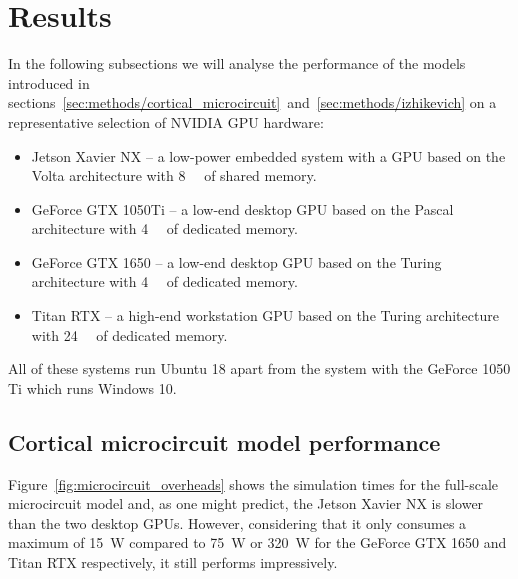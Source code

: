 \documentclass[utf8]{frontiersSCNS} %
\begin{document}
\section{Results}
In the following subsections we will analyse the performance of the models introduced in sections~\ref{sec:methods/cortical_microcircuit}~and~\ref{sec:methods/izhikevich} on a representative selection of NVIDIA GPU hardware:
%
\begin{itemize}
    \item Jetson Xavier NX -- a low-power embedded system with a GPU based on the Volta architecture with \SI{8}{\giga\byte} of shared memory.
    \item GeForce GTX 1050Ti -- a low-end desktop GPU based on the Pascal architecture with \SI{4}{\giga\byte} of dedicated memory.
    \item GeForce GTX 1650 -- a low-end desktop GPU based on the Turing architecture with \SI{4}{\giga\byte} of dedicated memory.
    \item Titan RTX -- a high-end workstation GPU based on the Turing architecture with \SI{24}{\giga\byte} of dedicated memory.
\end{itemize}
%
All of these systems run Ubuntu 18 apart from the system with the GeForce 1050 Ti which runs Windows 10.

\subsection{Cortical microcircuit model performance}
Figure~\ref{fig:microcircuit_overheads} shows the simulation times for the full-scale microcircuit model and, as one might predict, the Jetson Xavier NX is slower than the two desktop GPUs.
However, considering that it only consumes a maximum of \SI{15}{\watt} compared to \SI{75}{\watt} or \SI{320}{\watt} for the GeForce GTX 1650 and Titan RTX respectively, it still performs impressively.
\end{document}
